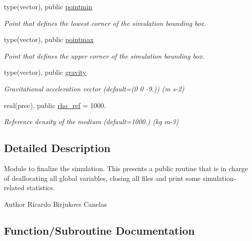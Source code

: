 \begin{DoxyCompactItemize}
type(vector), public \mbox{\hyperlink{namespacesimulation__globals_ab2427b2b4beb2d54ecc2b61862c09dcf}{pointmin}}
\begin{DoxyCompactList}\small\item\em Point that defines the lowest corner of the simulation bounding box. \end{DoxyCompactList}\item 
type(vector), public \mbox{\hyperlink{namespacesimulation__globals_aa7feec60259c6f63f3dba3a523ed5a60}{pointmax}}
\begin{DoxyCompactList}\small\item\em Point that defines the upper corner of the simulation bounding box. \end{DoxyCompactList}\item 
type(vector), public \mbox{\hyperlink{namespacesimulation__globals_a7308742dbca1348161d6cb02a06aa2a2}{gravity}}
\begin{DoxyCompactList}\small\item\em Gravitational acceleration vector (default=(0 0 -\/9.)) (m s-\/2) \end{DoxyCompactList}\item 
real(prec), public \mbox{\hyperlink{namespacesimulation__globals_a401ef3172f26620b9e089d7b297b36a0}{rho\+\_\+ref}} = 1000.
\begin{DoxyCompactList}\small\item\em Reference density of the medium (default=1000.) (kg m-\/3) \end{DoxyCompactList}\end{DoxyCompactItemize}


\subsection{Detailed Description}
Module to finalize the simulation. This presents a public routine that is in charge of deallocating all global variables, closing all files and print some simulation-\/related statistics. 

\begin{DoxyAuthor}{Author}
Ricardo Birjukovs Canelas 
\end{DoxyAuthor}


\subsection{Function/\+Subroutine Documentation}
\mbox{\label{namespacesimulation__globals_a2c6bf88542c503d1da58280ab3dcf772}} 
